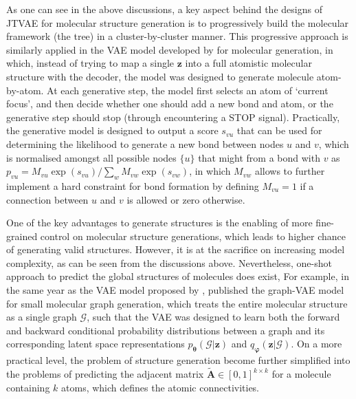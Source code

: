 As one can see in the above discussions, a key aspect behind the designs of JTVAE for molecular structure generation is to progressively build the molecular framework (the tree) in a cluster-by-cluster manner. This progressive approach is similarly applied in the VAE model developed by  \citet{liu2018constrained} for molecular generation, in which, instead of trying to map a single $\bm{z}$ into a full atomistic molecular structure with the decoder, the model was designed to generate molecule atom-by-atom. At each generative step, the model first selects an atom of `current focus', and then decide whether one should add a new bond and atom, or the generative step should stop (through encountering a STOP signal). Practically, the generative model is designed to output a score $s_{vu}$ that can be used for determining the likelihood to generate a new bond between nodes $u$ and $v$, which is normalised amongst all possible nodes $\{u\}$ that might from a bond with $v$ as $p_{vu}=M_{vu}\exp(s_{vu})/\sum_w M_{vw}\exp(s_{vw})$, in which $M_{vw}$ allows to further implement a hard constraint for bond formation by defining $M_{vu}=1$ if a connection between $u$ and $v$ is allowed or zero otherwise. 

One of the key advantages to generate structures is the enabling of more fine-grained control on molecular structure generations, which leads to higher chance of generating valid structures. However, it is at the sacrifice on increasing model complexity, as can be seen from the discussions above. Nevertheless, one-shot approach to predict the global structures of molecules does exist, For example, in the same year as the VAE model proposed by \citet{liu2018constrained}, \citet{simonovsky2018graphvae} published the graph-VAE model for small molecular graph generation, which treats the entire molecular structure as a single graph $\mathcal{G}$, such that the VAE was designed to learn both the forward and backward conditional probability distributions between a graph and its corresponding latent space representations $p_{\boldsymbol{\theta}}(\mathcal{G}|\bm{z})$ and $q_{\boldsymbol{\varphi}}(\bm{z}|\mathcal{G})$. On a more practical level, the problem of structure generation become further simplified into the problems of predicting the adjacent matrix $\tilde{\bm{A}}\in[0,1]^{k\times k}$ for a molecule containing $k$ atoms, which defines the atomic connectivities. 

